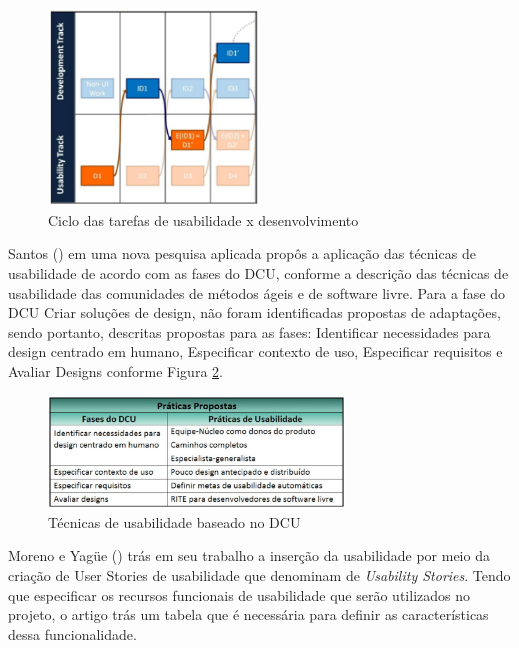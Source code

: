 \begin{figure}[H]
  \begin{center}
    \includegraphics[width=0.5\textwidth]{figuras/figuraCDR2.eps}
    \caption{Ciclo das tarefas de usabilidade x desenvolvimento}
    \label{fig:figuraCDR2}
  \end{center}
\end{figure}

%
Santos (\citeyear{santos2012}) em uma nova pesquisa aplicada propôs a aplicação das técnicas de usabilidade de acordo com as fases do DCU, conforme a descrição das técnicas de usabilidade das comunidades de métodos ágeis e de software livre. Para a fase do DCU Criar soluções de design, não foram identificadas propostas de adaptações, sendo portanto, descritas propostas para as fases: Identificar necessidades para design centrado em humano, Especificar contexto de uso, Especificar requisitos e Avaliar Designs conforme Figura \ref{fig:figuraDCU}.

\begin{figure}[H]
  \begin{center}
    \includegraphics[width=0.7\textwidth]{figuras/figuraDCU.eps}
    \caption{Técnicas de usabilidade baseado no DCU}
    \label{fig:figuraDCU}
  \end{center}
\end{figure}

%
Moreno e Yagüe (\citeyear{moreno2012}) trás em seu trabalho a inserção da usabilidade por meio da criação de User Stories de usabilidade que denominam de \textit{Usability Stories}. Tendo que especificar os recursos funcionais de usabilidade que serão utilizados no projeto, o artigo trás um tabela que é necessária para definir as características dessa funcionalidade.

